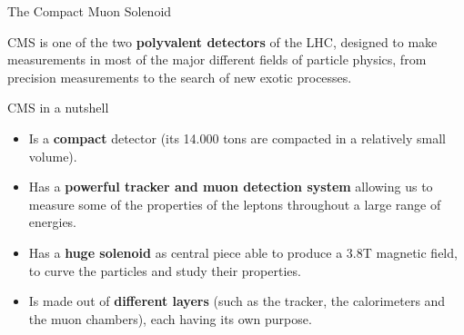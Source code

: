 \documentclass[8 pt]{beamer}
\begin{document}
\begin{frame}{The Compact Muon Solenoid}
	\begin{minipage}[c]{.49\linewidth}
	\justifying
	CMS is one of the two \textbf{polyvalent detectors} of the LHC, designed to make measurements in most of the major different fields of particle physics, from precision measurements to the search of new exotic processes. \\ \vspace{10pt}
	 \vfill
   	\end{minipage} \hfill
   	\begin{minipage}[c]{.42\linewidth}
		\begin{block}{\vspace{5pt} CMS in a nutshell}
	\begin{itemize}
	\justifying
	\vspace{5pt}
	\item Is a \textbf{compact} detector (its 14.000 tons are compacted in a relatively small volume). \\ \vspace{3pt}
	\item Has a \textbf{powerful tracker and muon detection system} allowing us to measure some of the properties of the leptons throughout a large range of energies. \\ \vspace{3pt}
	\item Has a \textbf{huge solenoid} as central piece able to produce a 3.8T magnetic field, to curve the particles and study their properties. \\ \vspace{3pt}
	\item Is made out of \textbf{different layers} (such as the tracker, the calorimeters and the muon chambers), each having its own purpose. \\ \vspace{5pt}
	\end{itemize}
	\end{block}
   	\end{minipage} \hfill \vfill	
\end{frame}
\end{document}
